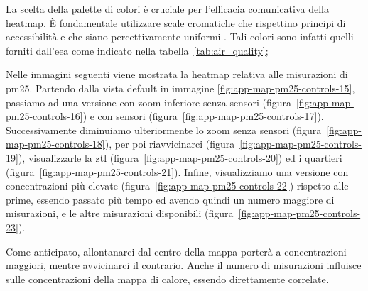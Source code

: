 La scelta della palette di colori è cruciale per l'efficacia comunicativa della heatmap.
È fondamentale utilizzare scale cromatiche che rispettino principi di accessibilità e che siano percettivamente
uniformi \citep{ware2012information}.
Tali colori sono infatti quelli forniti dall'\acrfull{eea} come indicato nella tabella~\ref{tab:air_quality};

Nelle immagini seguenti viene mostrata la heatmap relativa alle misurazioni di \acrshort{pm25}.
Partendo dalla vista default in immagine \ref{fig:app-map-pm25-controls-15},
passiamo ad una versione con zoom inferiore senza sensori (figura~\ref{fig:app-map-pm25-controls-16}) e con sensori
(figura~\ref{fig:app-map-pm25-controls-17}). Successivamente diminuiamo ulteriormente lo zoom senza sensori
(figura~\ref{fig:app-map-pm25-controls-18}), per poi riavvicinarci (figura~\ref{fig:app-map-pm25-controls-19}),
visualizzarle la \acrshort{ztl} (figura~\ref{fig:app-map-pm25-controls-20}) ed i quartieri
(figura~\ref{fig:app-map-pm25-controls-21}). Infine, visualizziamo una versione con concentrazioni più elevate
(figura~\ref{fig:app-map-pm25-controls-22}) rispetto alle prime, essendo passato più tempo ed avendo quindi un numero
maggiore di misurazioni, e le altre misurazioni disponibili (figura~\ref{fig:app-map-pm25-controls-23}).

Come anticipato, allontanarci dal centro della mappa porterà a concentrazioni maggiori, mentre avvicinarci il contrario.
Anche il numero di misurazioni influisce sulle concentrazioni della mappa di calore, essendo direttamente correlate.

